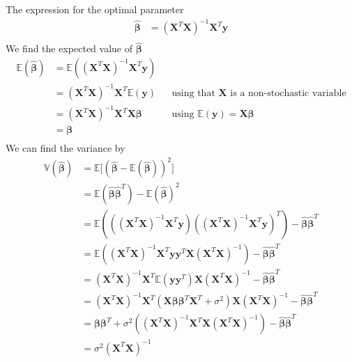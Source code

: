 %
The expression for the optimal parameter 
\begin{align*}
    \boldsymbol{\hat{\beta}} &= (\boldsymbol{X}^{T} \boldsymbol{X})^{-1} \boldsymbol{X}^{T} \boldsymbol{y} \\
\end{align*}
We find the expected value of $\boldsymbol{\hat{\beta}}$
\begin{align*}
    \mathbb{E}(\boldsymbol{\hat{\beta}}) &= \mathbb{E}((\boldsymbol{X}^{T} \boldsymbol{X})^{-1} \boldsymbol{X}^{T} \boldsymbol{y}) \\
    &= (\boldsymbol{X}^{T} \boldsymbol{X})^{-1} \boldsymbol{X}^{T} \mathbb{E}(\boldsymbol{y}) && \text{using that $\boldsymbol{X}$ is a non-stochastic variable} \\
    &= (\boldsymbol{X}^{T} \boldsymbol{X})^{-1} \boldsymbol{X}^{T} \boldsymbol{X} \boldsymbol{\beta} && \text{using $\mathbb{E}(\boldsymbol{y}) = \boldsymbol{X} \boldsymbol{\beta}$} \\
    &= \boldsymbol{\beta} \\
\end{align*}
%
We can find the variance by 
\begin{align*}
    \mathbb{V}(\boldsymbol{\hat{\beta}}) &= \mathbb{E} \big[ (\boldsymbol{\hat{\beta}} - \mathbb{E}(\boldsymbol{\hat{\beta}}))^{2} \big] \\
    &= \mathbb{E} (\boldsymbol{\hat{\beta}} \boldsymbol{\hat{\beta}}^{T}) - \mathbb{E}(\boldsymbol{\hat{\beta}})^{2}  \\
    &= \mathbb{E} (((\boldsymbol{X}^{T} \boldsymbol{X})^{-1} \boldsymbol{X}^{T} \boldsymbol{y}) ((\boldsymbol{X}^{T} \boldsymbol{X})^{-1} \boldsymbol{X}^{T} \boldsymbol{y})^{T}) - \boldsymbol{\hat{\beta}}\boldsymbol{\hat{\beta}}^{T}  \\
    &= \mathbb{E} ((\boldsymbol{X}^{T} \boldsymbol{X})^{-1} \boldsymbol{X}^{T} \boldsymbol{y} \boldsymbol{y}^{T} \boldsymbol{X} (\boldsymbol{X}^{T} \boldsymbol{X})^{-1}) - \boldsymbol{\hat{\beta}}\boldsymbol{\hat{\beta}}^{T}  \\
    &= (\boldsymbol{X}^{T} \boldsymbol{X})^{-1} \boldsymbol{X}^{T} \mathbb{E} (\boldsymbol{y} \boldsymbol{y}^{T}) \boldsymbol{X} (\boldsymbol{X}^{T} \boldsymbol{X})^{-1} - \boldsymbol{\hat{\beta}}\boldsymbol{\hat{\beta}}^{T}  \\
    &= (\boldsymbol{X}^{T} \boldsymbol{X})^{-1} \boldsymbol{X}^{T} (\boldsymbol{X} \boldsymbol{\beta} \boldsymbol{\beta}^{T} \boldsymbol{X}^{T} + \sigma^{2}) \boldsymbol{X} (\boldsymbol{X}^{T} \boldsymbol{X})^{-1} - \boldsymbol{\hat{\beta}}\boldsymbol{\hat{\beta}}^{T}  \\
    &= \boldsymbol{\beta} \boldsymbol{\beta}^{T} + \sigma^{2}((\boldsymbol{X}^{T} \boldsymbol{X})^{-1} \boldsymbol{X}^{T} \boldsymbol{X} (\boldsymbol{X}^{T} \boldsymbol{X})^{-1}) - \boldsymbol{\hat{\beta}}\boldsymbol{\hat{\beta}}^{T}  \\
    &= \sigma^{2}(\boldsymbol{X}^{T} \boldsymbol{X})^{-1} \\
\end{align*}
